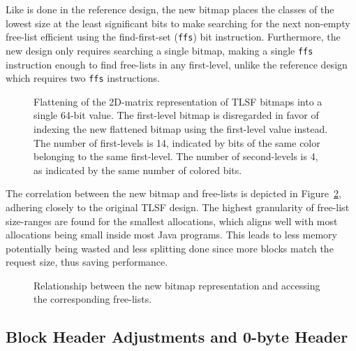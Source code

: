 Like is done in the reference design, the new bitmap places the classes of the lowest size at the least significant bits to make searching for the next non-empty free-list efficient using the find-first-set (\texttt{ffs}) bit instruction. Furthermore, the new design only requires searching a single bitmap, making a single \texttt{ffs} instruction enough to find free-lists in any first-level, unlike the reference design which requires two \texttt{ffs} instructions.

\begin{figure}[h]
    \centering
    
    \vspace*{4mm}
    \caption{Flattening of the 2D-matrix representation of TLSF bitmaps into a single 64-bit value. The first-level bitmap is disregarded in favor of indexing the new flattened bitmap using the first-level value instead. The number of first-levels is 14, indicated by bits of the same color belonging to the same first-level. The number of second-levels is 4, as indicated by the same number of colored bits.}
    \label{fig:bitmap_flattening}
\end{figure}

The correlation between the new bitmap and free-lists is depicted in Figure~\ref{fig:bitmap_relationship}, adhering closely to the original TLSF design. The highest granularity of free-list size-ranges are found for the smallest allocations, which aligns well with most allocations being small inside most Java programs. This leads to less memory potentially being wasted and less splitting done since more blocks match the request size, thus saving performance.

\begin{figure}[h]
    \centering
    \vspace*{0.2cm}
    
    \vspace*{1mm}
    \caption{Relationship between the new bitmap representation and accessing the corresponding free-lists.}
    \label{fig:bitmap_relationship}
\end{figure}

\subsection{Block Header Adjustments and 0-byte Header}
\label{sec:adaptations_impl:0-byte-header}

